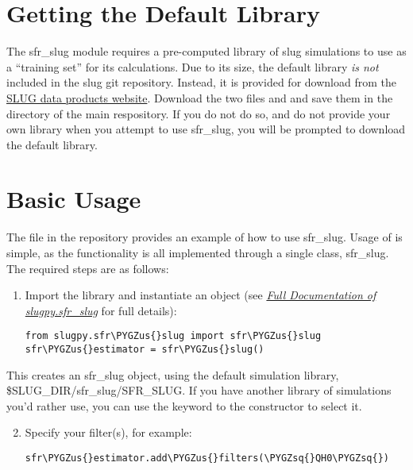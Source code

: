 \documentclass[letterpaper,10pt,english]{sphinxmanual}
\def\PYGZus{\char`\_}
\def\PYGZsq{\char`\'}
\renewcommand\PYGZsq{\textquotesingle}
\begin{document}
\section{Getting the Default Library}
\label{sfr_slug:getting-the-default-library}
The sfr\_slug module requires a pre-computed library of slug simulations to use as a ``training set'' for its calculations. Due to its size, the default library \emph{is not} included in the slug git repository. Instead, it is provided for download from the \href{http://www.slugsps.com/data}{SLUG data products website}. Download the two files  and  and save them in the  directory of the main respository. If you do not do so, and do not provide your own library when you attempt to use sfr\_slug, you will be prompted to download the default library.


\section{Basic Usage}
\label{sfr_slug:basic-usage}
The  file in the repository provides an example of how to use sfr\_slug. Usage of is simple, as the functionality is all implemented through a single class, sfr\_slug. The required steps are as follows:
\begin{enumerate}
\item {} 
Import the library and instantiate an  object (see {\hyperref[sfr_slug:sec\string-sfr\string-slug\string-full]{\emph{Full Documentation of slugpy.sfr\_slug}}} for full details):

\begin{Verbatim}[commandchars=\\\{\}]
from slugpy.sfr\PYGZus{}slug import sfr\PYGZus{}slug
sfr\PYGZus{}estimator = sfr\PYGZus{}slug()
\end{Verbatim}

\end{enumerate}

This creates an sfr\_slug object, using the default simulation library, \$SLUG\_DIR/sfr\_slug/SFR\_SLUG. If you have another library of simulations you'd rather use, you can use the  keyword to the  constructor to select it.
\begin{enumerate}
\setcounter{enumi}{1}
\item {} 
Specify your filter(s), for example:

\begin{Verbatim}[commandchars=\\\{\}]
sfr\PYGZus{}estimator.add\PYGZus{}filters(\PYGZsq{}QH0\PYGZsq{})
\end{Verbatim}

\end{enumerate}
\end{document}
